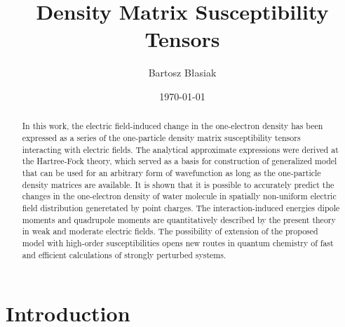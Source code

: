 \documentclass[aip,amsmath,amssymb,reprint]{revtex4-1}
\begin{document}

\title{Density Matrix Susceptibility Tensors} %

\author{Bartosz B{\l}asiak}

\date{\today}

\begin{abstract}


In this work, the electric field\hyp{}induced change in the one\hyp{}electron density
has been expressed as a series of the one\hyp{}particle density matrix susceptibility tensors
interacting with electric fields. The analytical approximate expressions were derived
at the Hartree\hyp{}Fock theory, which served as a basis for construction of generalized
model that can be used for an arbitrary form of wavefunction as long as the one\hyp{}particle
density matrices are available. It is shown that it is possible to accurately predict the changes
in the one\hyp{}electron density of water molecule in spatially non\hyp{}uniform electric field distribution
generetated by point charges. The interaction\hyp{}induced energies
dipole moments and quadrupole moments
are quantitatively described by the present theory in weak and moderate electric fields.
The possibility of extension of the proposed model with high\hyp{}order susceptibilities
opens new routes in quantum chemistry of fast and efficient calculations of strongly perturbed systems.
\end{abstract}

\pacs{}%

\maketitle %

\section{\label{s:1}Introduction}
\end{document}
